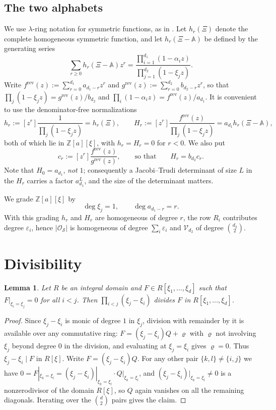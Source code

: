 \documentclass[11pt,reqno]{amsart}
\theoremstyle{plain}
\newtheorem{lemma}[theorem]{Lemma}
\theoremstyle{definition}
\newcommand{\bA}{\mathbb{A}}
\newcommand{\bX}{\Xi}
\newcommand{\cO}{\mathcal{O}}
\newcommand{\cS}{\mathcal{S}}
\newcommand{\cV}{\mathcal{V}}
\newcommand{\ZZ}{\mathbb{Z}}
\newcommand{\rev}{\mathrm{rev}}
\begin{document}
\subsection*{The two alphabets}
We use $\lambda$-ring notation for symmetric functions, as in \cite{Lascoux,LP}.
Let $h_r(\bX)$ denote the complete homogeneous symmetric function, and let
$h_r(\bX-\bA)$ be defined by the generating series
\[
  \sum_{r\ge0}h_r(\bX-\bA)z^r=\frac{\prod_{i=1}^{d_1}(1-\alpha_iz)}
                                    {\prod_{j=1}^{d_2}(1-\xi_jz)} .
\]
Write $f^\rev(z):=\sum_{r=0}^{d_1}a_{d_1-r}z^r$ and
$g^\rev(z):=\sum_{r=0}^{d_2}b_{d_2-r}z^r$, so that
$\prod_j(1-\xi_jz)=g^\rev(z)/b_{d_2}$ and
$\prod_i(1-\alpha_iz)=f^\rev(z)/a_{d_1}$. It is convenient to use the
denominator-free normalizations
\begin{equation}\label{eq:hH}
  h_r:=[z^r]\frac{1}{\prod_j(1-\xi_jz)}=h_r(\bX),
  \qquad
  H_r:=[z^r]\frac{f^\rev(z)}{\prod_j(1-\xi_jz)}=a_{d_1}h_r(\bX-\bA),
\end{equation}
both of which lie in $\ZZ[a][\xi]$, with $h_r=H_r=0$ for $r<0$. We also put
\begin{equation}\label{eq:c}
  c_r:=[z^r]\frac{f^\rev(z)}{g^\rev(z)},\qquad\text{so that}\qquad H_r=b_{d_2}c_r .
\end{equation}
Note that $H_0=a_{d_1}$, \emph{not} $1$; consequently a Jacobi--Trudi determinant
of size $L$ in the $H_r$ carries a factor $a_{d_1}^{L}$, and the size of the
determinant matters.

We grade $\ZZ[a][\xi]$ by
\begin{equation}\label{eq:grading}
  \deg\xi_j=1,\qquad \deg a_{d_1-r}=r .
\end{equation}
With this grading $h_r$ and $H_r$ are homogeneous of degree $r$, the row $R_i$
contributes degree $\varepsilon_i$, hence $|\cO_\cS|$ is homogeneous of degree
$\sum_i\varepsilon_i$ and $\cV_{d_2}$ of degree $\binom{d_2}{2}$.

\section{Divisibility}\label{sec:div}

\begin{lemma}\label{lem:alt}
Let $R$ be an integral domain and $F\in R[\xi_1,\dots,\xi_d]$ such that
$F|_{\xi_i=\xi_j}=0$ for all $i<j$. Then $\prod_{i<j}(\xi_j-\xi_i)$ divides $F$
in $R[\xi_1,\dots,\xi_d]$.
\end{lemma}

\begin{proof}
Since $\xi_j-\xi_i$ is monic of degree $1$ in $\xi_j$, division with remainder by
it is available over any commutative ring: $F=(\xi_j-\xi_i)Q+\varrho$ with
$\varrho$ not involving $\xi_j$ beyond degree $0$ in the division, and evaluating
at $\xi_j=\xi_i$ gives $\varrho=0$. Thus $\xi_j-\xi_i\mid F$ in $R[\xi]$.
Write $F=(\xi_j-\xi_i)Q$. For any other pair $\{k,l\}\ne\{i,j\}$ we have
$0=F|_{\xi_k=\xi_l}=(\xi_j-\xi_i)|_{\xi_k=\xi_l}\cdot Q|_{\xi_k=\xi_l}$, and
$(\xi_j-\xi_i)|_{\xi_k=\xi_l}\ne0$ is a nonzerodivisor of the domain $R[\xi]$, so
$Q$ again vanishes on all the remaining diagonals. Iterating over the
$\binom d2$ pairs gives the claim.
\end{proof}
\end{document}
